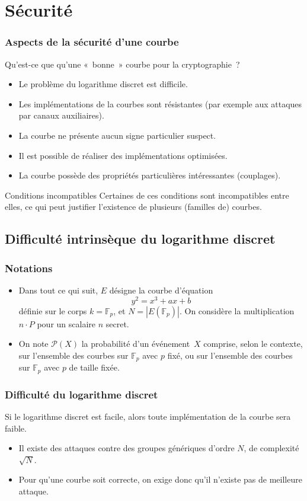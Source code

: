 \documentclass[francais]{beamer}
\newcommand{\abs}[1]{\left| #1 \right|}
\newcommand{\F}{\mathbb{F}}
\newcommand{\prob}{\mathcal{P}}
\begin{document}
\section{Sécurité}

\begin{frame}\frametitle{Aspects de la sécurité d'une courbe}
Qu'est-ce que qu'une « bonne » courbe pour la cryptographie ?
\begin{itemize}
\item Le problème du logarithme discret est difficile.
\item Les implémentations de la courbes sont résistantes
(par exemple aux attaques par canaux auxiliaires).
\item La courbe ne présente aucun signe particulier suspect.
\item Il est possible de réaliser des implémentations optimisées.
\item La courbe possède des propriétés particulières intéressantes (couplages).
\end{itemize}
\begin{block}{Conditions incompatibles}
Certaines de ces conditions sont incompatibles entre elles,
ce qui peut justifier l'existence de plusieurs (familles de) courbes.
\end{block}
\end{frame}

\subsection{Difficulté intrinsèque du logarithme discret}

\begin{frame}\frametitle{Notations}
\begin{itemize}
\item Dans tout ce qui suit, $E$ désigne la courbe d'équation
\[ y^2 = x^3 + a x + b\]
définie sur le corps $k = \F_p$, et $N = \abs{E(\F_p)}$.
On considère la multiplication $n · P$ pour un scalaire $n$ secret.
\bigskip
\item On note $\prob(X)$ la probabilité d'un événement~$X$
comprise, selon le contexte,
sur l'ensemble des courbes sur $\F_p$ avec $p$ fixé,
ou sur l'ensemble des courbes sur $\F_p$ avec $p$ de taille fixée.
\end{itemize}
\end{frame}

\begin{frame}\frametitle{Difficulté du logarithme discret}
\begin{block}{}
Si le logarithme discret est facile, alors
toute implémentation de la courbe sera faible.
\end{block}
\begin{itemize}
\item Il existe des attaques contre des groupes génériques d'ordre $N$,
de complexité $\sqrt{N}$.
\item Pour qu'une courbe soit correcte,
on exige donc qu'il n'existe pas de meilleure attaque.
\end{itemize}
\end{frame}
\end{document}
